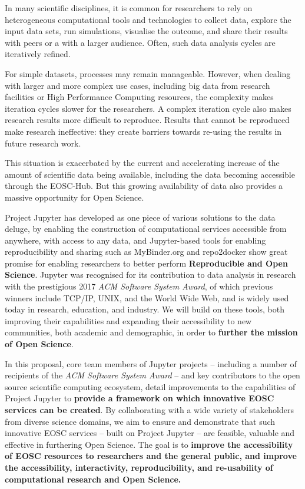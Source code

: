 
In many scientific disciplines, it is common for researchers to rely on
heterogeneous computational tools and technologies to collect data,
explore the input data sets, run simulations, visualise the outcome,
and share their results with peers or a with a larger audience. Often,
such data analysis cycles are iteratively refined.

For simple datasets, processes may remain manageable. However, when
dealing with larger and more complex use cases, including big data
from research facilities or High Performance Computing resources, the
complexity makes iteration cycles slower for the researchers. A
complex iteration cycle also makes research results more difficult to
reproduce.
Results that cannot be reproduced make research ineffective: they
create barriers towards re-using the results in future research work.

This situation is exacerbated by the current and accelerating increase of the amount
of scientific data being available, including the data becoming
accessible through the EOSC-Hub. But this growing availability of data also provides a massive opportunity
for Open Science.

Project Jupyter has developed as one piece of various solutions to the data deluge,
by enabling the construction of computational services accessible from anywhere,
with access to any data,
and Jupyter-based tools for enabling reproducibility and sharing such as MyBinder.org and repo2docker
show great promise for enabling researchers to better perform \textbf{Reproducible and Open Science}.
Jupyter was recognised for its contribution to data analysis in research with the prestigious 2017 \emph{ACM Software System Award}, of which previous winners include TCP/IP, UNIX, and the World Wide Web,
and is widely used today in research,
education, and industry.
We will build on these tools,
both improving their capabilities
and expanding their accessibility to new communities,
both academic and demographic,
in order to \textbf{further the mission of Open Science}.

In this proposal, core team members of Jupyter projects -- including a
number of recipients of the \emph{ACM Software System Award} -- and key contributors to the
open source scientific computing ecosystem,
detail improvements to the
capabilities of Project Jupyter
to \textbf{provide a framework on which innovative EOSC services can be created}.
By collaborating with a wide variety of stakeholders from diverse
science domains,
we aim to ensure and demonstrate that such
innovative EOSC services -- built on Project Jupyter -- are feasible, valuable and effective in furthering Open Science.
The goal is to \textbf{improve the
accessibility of EOSC resources to researchers and the general public,
and improve the accessibility, interactivity, reproducibility, and
re-usability of computational research
and Open Science.}


